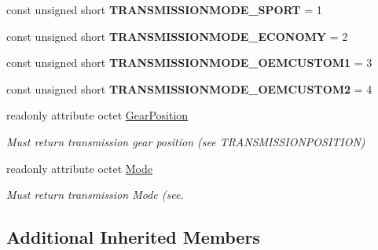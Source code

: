 \begin{DoxyCompactItemize}
\item 
\hypertarget{interfaceVehicle_1_1Transmission_addffa52e79d0374da581c8c2566259a6}{const unsigned short {\bfseries T\-R\-A\-N\-S\-M\-I\-S\-S\-I\-O\-N\-M\-O\-D\-E\-\_\-\-S\-P\-O\-R\-T} = 1}\label{interfaceVehicle_1_1Transmission_addffa52e79d0374da581c8c2566259a6}

\item 
\hypertarget{interfaceVehicle_1_1Transmission_abe669223894b776651cc4ac6840f271a}{const unsigned short {\bfseries T\-R\-A\-N\-S\-M\-I\-S\-S\-I\-O\-N\-M\-O\-D\-E\-\_\-\-E\-C\-O\-N\-O\-M\-Y} = 2}\label{interfaceVehicle_1_1Transmission_abe669223894b776651cc4ac6840f271a}

\item 
\hypertarget{interfaceVehicle_1_1Transmission_a2039067922c958d79a09512d512357e1}{const unsigned short {\bfseries T\-R\-A\-N\-S\-M\-I\-S\-S\-I\-O\-N\-M\-O\-D\-E\-\_\-\-O\-E\-M\-C\-U\-S\-T\-O\-M1} = 3}\label{interfaceVehicle_1_1Transmission_a2039067922c958d79a09512d512357e1}

\item 
\hypertarget{interfaceVehicle_1_1Transmission_aae0ae638eed5a4089969629d70436e6f}{const unsigned short {\bfseries T\-R\-A\-N\-S\-M\-I\-S\-S\-I\-O\-N\-M\-O\-D\-E\-\_\-\-O\-E\-M\-C\-U\-S\-T\-O\-M2} = 4}\label{interfaceVehicle_1_1Transmission_aae0ae638eed5a4089969629d70436e6f}

\item 
readonly attribute octet \hyperlink{interfaceVehicle_1_1Transmission_a71c554ce9d892f772432551eea69f7ec}{Gear\-Position}
\begin{DoxyCompactList}\small\item\em Must return transmission gear position (see T\-R\-A\-N\-S\-M\-I\-S\-S\-I\-O\-N\-P\-O\-S\-I\-T\-I\-O\-N) \end{DoxyCompactList}\item 
readonly attribute octet \hyperlink{interfaceVehicle_1_1Transmission_a2b5b6c11767058181b5ad3fad8bd6d32}{Mode}
\begin{DoxyCompactList}\small\item\em Must return transmission Mode (see. \end{DoxyCompactList}\end{DoxyCompactItemize}
\subsection*{Additional Inherited Members}


